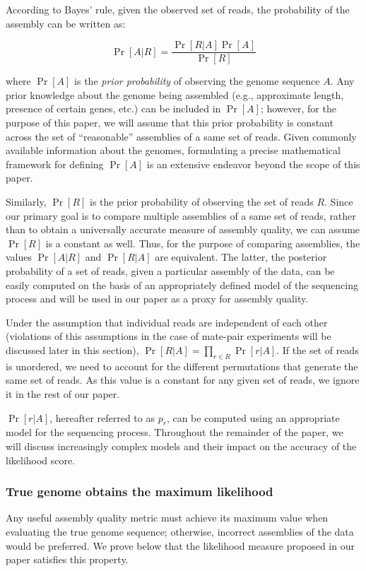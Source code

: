 According to Bayes' rule, given the observed set of reads, the probability of the assembly can be written as:

\begin{equation}
  \Pr[A \vert R] = \frac{\Pr[R \vert A] \Pr[A]}{\Pr[R]}
\end{equation}

\noindent where $\Pr[A]$ is the \emph{prior probability} of observing the genome
sequence $A$. Any prior knowledge about the genome being assembled
(e.g., approximate length, presence of certain genes, etc.) can be
included in $\Pr[A]$; however, for the purpose of this paper, we will
assume that this prior probability is constant across the set of
``reasonable'' assemblies of a same set of reads.
Given commonly available information about the genomes, formulating a precise mathematical framework for defining $\Pr[A]$ is an extensive endeavor beyond the scope of this paper.

Similarly, $\Pr[R]$ is the prior probability of observing the set of
reads $R$.  Since our primary goal is to compare multiple assemblies
of a same set of reads, rather than to obtain a universally accurate
measure of assembly quality, we can assume $\Pr[R]$ is a constant as
well.  Thus, for the purpose of comparing assemblies, the values $\Pr[A
  \vert R]$ and $\Pr[R \vert A]$ are equivalent.  The latter, the
posterior probability of a set of reads, given a particular assembly of
the data, can be easily computed on the basis of an appropriately
defined model of the sequencing process and will be used in our paper
as a proxy for assembly quality.

Under the assumption that individual reads are independent of each
other (violations of this assumptions in the case of mate-pair
experiments will be discussed later in this section), $\Pr[R \vert A]
= \prod_{r \in R} \Pr[r \vert A]$. If the set of reads is unordered, we need to account for the different permutations that generate the same set of reads.  As this value is a constant for any given set of reads, we ignore it in the rest of our paper.

$\Pr[r \vert A]$, hereafter referred to as $p_r$, can be computed using an appropriate
model for the sequencing process.  Throughout the remainder of the
paper, we will discuss increasingly complex models and their impact on
the accuracy of the likelihood score.

\subsubsection{True genome obtains the maximum likelihood}
\label{maximizing_likelihood}
Any useful assembly quality metric must achieve its maximum value when
evaluating the true genome sequence; otherwise, incorrect assemblies of
the data would be preferred.  We prove below that the likelihood
measure proposed in our paper satisfies this property.

